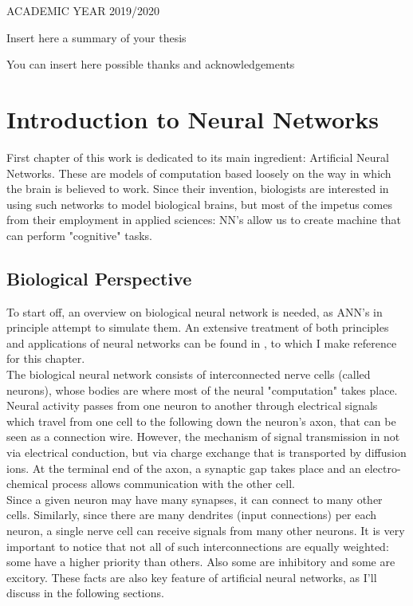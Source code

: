 \documentclass[%
    corpo=11pt,
    twoside,
    stile=classica,
    oldstyle,
    autoretitolo,
    tipotesi=magistrale,
    greek,
    evenboxes,
    english
]{toptesi}
\begin{document}
\vskip 2.5cm


\centerline{ACADEMIC YEAR 2019/2020}






\sommario

Insert here a summary of your thesis

\ringraziamenti

You can insert here possible thanks and acknowledgements

\tablespagetrue\figurespagetrue %
\indici

\mainmatter

\chapter{Introduction to Neural Networks}
First chapter of this work is dedicated to its main ingredient: Artificial Neural Networks. These are models of computation based loosely on the way in which the brain is believed to work. Since their invention, biologists are interested in using such networks to model biological brains, but most of the impetus comes from their employment in applied sciences: NN's allow us to create machine that can perform "cognitive" tasks.
\section{Biological Perspective}
To start off, an overview on biological neural network is needed, as ANN's in principle attempt to simulate them. An extensive treatment of both principles and applications of neural networks can be found in \cite{graupe}, to which I make reference for this chapter. \\
The biological neural network consists of interconnected nerve cells (called neurons), whose bodies are where most of the neural "computation" takes place. Neural activity passes from one neuron to another through electrical signals which travel from one cell to the following down the neuron's axon, that can be seen as a connection wire. However, the mechanism of signal transmission in not via electrical conduction, but via charge exchange that is transported by diffusion ions. At the terminal end of the axon, a synaptic gap takes place and an electro-chemical process allows communication with the other cell. \\
Since a given neuron may have many synapses, it can connect to many other cells. Similarly, since there are many dendrites (input connections) per each neuron, a single nerve cell can receive signals from many other neurons. It is very important to notice that not all of such interconnections are equally weighted: some have a higher priority than others. Also some are inhibitory and some are excitory. These facts are also key feature of artificial neural networks, as I'll discuss in the following sections.
\end{document}
